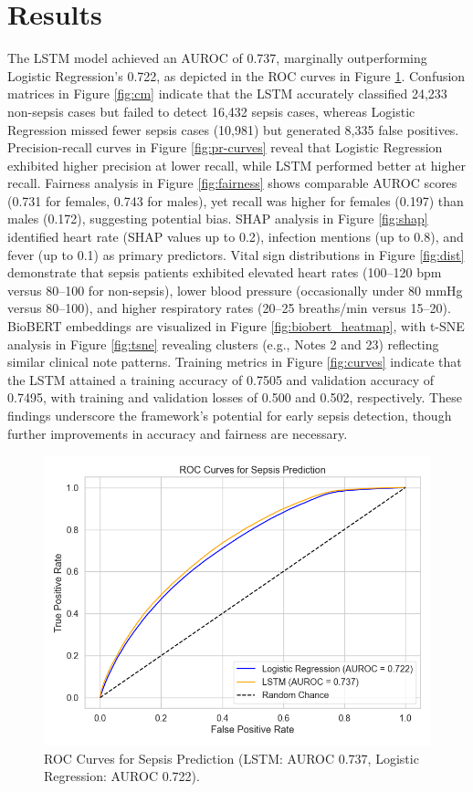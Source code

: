 \documentclass[journal]{IEEEtran}
\begin{document}
\section{Results}
The LSTM model achieved an AUROC of 0.737, marginally outperforming Logistic Regression’s 0.722, as depicted in the ROC curves in Figure \ref{fig:roc}. Confusion matrices in Figure \ref{fig:cm} indicate that the LSTM accurately classified 24,233 non-sepsis cases but failed to detect 16,432 sepsis cases, whereas Logistic Regression missed fewer sepsis cases (10,981) but generated 8,335 false positives. Precision-recall curves in Figure \ref{fig:pr-curves} reveal that Logistic Regression exhibited higher precision at lower recall, while LSTM performed better at higher recall. Fairness analysis in Figure \ref{fig:fairness} shows comparable AUROC scores (0.731 for females, 0.743 for males), yet recall was higher for females (0.197) than males (0.172), suggesting potential bias. SHAP analysis in Figure \ref{fig:shap} identified heart rate (SHAP values up to 0.2), infection mentions (up to 0.8), and fever (up to 0.1) as primary predictors. Vital sign distributions in Figure \ref{fig:dist} demonstrate that sepsis patients exhibited elevated heart rates (100–120 bpm versus 80–100 for non-sepsis), lower blood pressure (occasionally under 80 mmHg versus 80–100), and higher respiratory rates (20–25 breaths/min versus 15–20). BioBERT embeddings are visualized in Figure \ref{fig:biobert_heatmap}, with t-SNE analysis in Figure \ref{fig:tsne} revealing clusters (e.g., Notes 2 and 23) reflecting similar clinical note patterns. Training metrics in Figure \ref{fig:curves} indicate that the LSTM attained a training accuracy of 0.7505 and validation accuracy of 0.7495, with training and validation losses of 0.500 and 0.502, respectively. These findings underscore the framework’s potential for early sepsis detection, though further improvements in accuracy and fairness are necessary.

\begin{figure}[ht]
    \centering
    \includegraphics[width=0.8\columnwidth]{roc_curves.png}
    \caption{ROC Curves for Sepsis Prediction (LSTM: AUROC 0.737, Logistic Regression: AUROC 0.722).}
    \label{fig:roc}
\end{figure}
\end{document}
